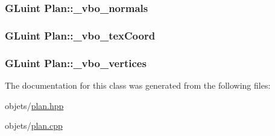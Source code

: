 \hypertarget{class_plan_aa5db33661be2dfcecf68683c33eb22b9}{
\subsubsection[{\+\_\+vbo\+\_\+normals}]{\setlength{\rightskip}{0pt plus 5cm}G\+Luint Plan\+::\+\_\+vbo\+\_\+normals\hspace{0.3cm}{\ttfamily [private]}}}\label{class_plan_aa5db33661be2dfcecf68683c33eb22b9}
\hypertarget{class_plan_a3c16becd29f35260b79af8b9cb6fa892}{
\subsubsection[{\+\_\+vbo\+\_\+tex\+Coord}]{\setlength{\rightskip}{0pt plus 5cm}G\+Luint Plan\+::\+\_\+vbo\+\_\+tex\+Coord\hspace{0.3cm}{\ttfamily [private]}}}\label{class_plan_a3c16becd29f35260b79af8b9cb6fa892}
\hypertarget{class_plan_a7b203dc36964da663836cf7614fe711a}{
\subsubsection[{\+\_\+vbo\+\_\+vertices}]{\setlength{\rightskip}{0pt plus 5cm}G\+Luint Plan\+::\+\_\+vbo\+\_\+vertices\hspace{0.3cm}{\ttfamily [private]}}}\label{class_plan_a7b203dc36964da663836cf7614fe711a}


The documentation for this class was generated from the following files\+:\begin{DoxyCompactItemize}
\item 
objets/\hyperlink{plan_8hpp}{plan.\+hpp}\item 
objets/\hyperlink{plan_8cpp}{plan.\+cpp}\end{DoxyCompactItemize}
